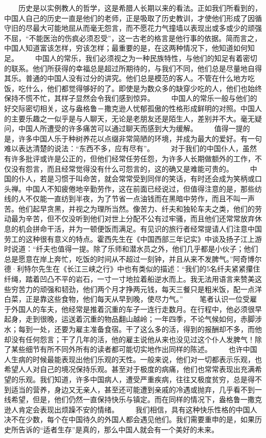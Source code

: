 \documentclass[12pt,oneside]{book}
\begin{document}
\begin{common-format}
　　历史是以实例教人的哲学，这是希腊人长期以来的看法。正如我们所看到的，中国人自己的历史一直是他们的老师，正是吸取了历史教训，才使他们形成了因循守旧的尽最大可能地屈从而毫无怨言，而不愿花力气撞墙以表现出或多或少的顽强不屈，“不能医治的伤疯必须忍受”，这一古老的格言是他行事的依据。简而言之，中国人知道富该怎样，穷该怎样；最重要的是，在这两种情况下，他知道如何知足。 
　　中国人的常乐，我们必须视之为一种民族特性，与他们的知足有着密切的联系。他们所获得的幸福总是超过所期待的，与我们不同，他们总是尽量地自得其乐。普通的中国人没有过分的讲究。他们总是模范的客人。不管在什么地方吃饭，吃什么，他们都觉得够好的了。即使是为数众多的缺穿少吃的人，他们也始终保持不慌不忙，其样子显然会令我们感到惊异。 
　　中国人的常乐一般与他们的好交际密切相关，这与盎格鲁－撒克逊人忧郁孤傲的性格形成鲜明的对照。中国人的主要乐趣之一似乎是与人聊天，无论是老朋友还是陌生人，差别并不大。毫无疑问，中国人所遭受的许多痛苦可以通过聊天而感到大为缓解。 
　　值得一提的是，许多中国人乐于种树养花以点缀非常简陋的环境，并成为最大的爱好。有一句难以表达清楚的说法：“东西不多，应有尽有”。 
　　对于我们的中国仆人，虽然有许多批评或许是公正的，但他们经常任劳任怨，为许多人长期做额外的工作，不仅没有怨言，而且经常觉得没有什么可怨言的，这的确又是难能可贵的。 
　　中国的仆人，若是习惯于叫命苦，就会常常受到同伴的笑话，有时还会成为笑柄或口头禅。中国人不知疲倦地辛勤劳作，这在前面已经说过，但值得注意的是，那些纺线的人不仅能一直纺到半夜，为了节省一点油钱而在黑暗中劳作，而且不叫一声苦。他们起早贪黑，并视之为理所当然。像苦力、纤夫和独轮车夫之类，他们的劳动最为辛苦，但不仅没听到他们对世上分配不公有过牢骚，而且他们还常常放弃休息的机会拼命干活，并为一顿便饭而满足。有见识的旅行者经常提请人们注意中国劳工的这种很有意义的特点。霍西先生在《中国西部三年记实》中谈及扬子江上游时说道：“纤夫也值得一提。除了乐师和潜水员之外，他们几乎都是小伙子；他们总是愿意在岸上奔忙，吃饭的时间从不超过一刻钟，并且从来不发脾气。”阿奇博尔德·利特尔先生在《长江三峡之行》中也有类似的描述：“我们的5名纤夫紧紧攥住纤绳，踏着凹凸不平的岩石，一寸一寸地拉着船逆水而上。我无法用语言来赞美这些穷苦力的顽强和韧劲，他们两个月才挣两元钱，每天三餐只是粗米饭，配一点洋白菜，正是靠这些食物，他们每天从早到晚，使尽力气。” 
　　笔者认识一位受雇于外国人的车夫，他经常是推着沉重的车子一连行走数月。在行程中，他必须很早起身，走到很晚，运送着沉重的物品翻山越岭；一年四季，不论气候如何，赤脚涉水；每到一处，还要为雇主准备食宿。干了这么多的活，得到的报酬却不多，而他却没有任何怨言；干了几年的活，他的雇主说他从来也没见过这个仆人发脾气！除了某些细节有所不同外所有的读者都可能切实地作出同样的陈述。 
　　也许中国人生病的时候最能表现出他们乐观的天性。一般来说，他们对一切都表示乐观，也希望人人对自己的境况保持乐观。甚至对于极度的病痛，他们也常常表现出充满希望的乐观。我们知道，许多中国病人，遭受严重疾病，往往又极度贫穷，总是得不到适当的营养，身边又无亲人，甚至还可能遭到亲戚的冷遇或抛弃，几乎看不到一线希望，但是，他们仍然一直保持快乐与镇定。而在同样的情况下，盎格鲁一撒克逊人肯定会表现出烦躁不安的情绪。 
　　我们相信，具有这种快乐性格的中国人决不在少数，每个在中国待久的外国人都会遇见他们。我们需要重申的是，如果历史所告诉的“适者生存”是真的，那么中国人就会有一个美好的未来。 



\end{common-format}
\end{document}
